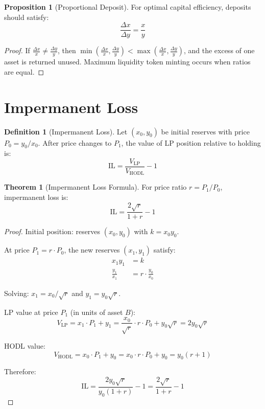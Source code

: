 \documentclass[11pt,a4paper]{article}
\theoremstyle{definition}
\newtheorem{definition}{Definition}
\newtheorem{theorem}{Theorem}
\newtheorem{proposition}{Proposition}
\begin{document}
\begin{proposition}[Proportional Deposit]
For optimal capital efficiency, deposits should satisfy:
\begin{equation}
\frac{\Delta x}{\Delta y} = \frac{x}{y}
\end{equation}
\end{proposition}

\begin{proof}
If $\frac{\Delta x}{x} \neq \frac{\Delta y}{y}$, then $\min\left(\frac{\Delta x}{x}, \frac{\Delta y}{y}\right) < \max\left(\frac{\Delta x}{x}, \frac{\Delta y}{y}\right)$, and the excess of one asset is returned unused. Maximum liquidity token minting occurs when ratios are equal.
\end{proof}

\section{Impermanent Loss}

\begin{definition}[Impermanent Loss]
Let $(x_0, y_0)$ be initial reserves with price $P_0 = y_0/x_0$. After price changes to $P_1$, the value of LP position relative to holding is:
\begin{equation}
\text{IL} = \frac{V_{\text{LP}}}{V_{\text{HODL}}} - 1
\end{equation}
\end{definition}

\begin{theorem}[Impermanent Loss Formula]
For price ratio $r = P_1/P_0$, impermanent loss is:
\begin{equation}
\text{IL} = \frac{2\sqrt{r}}{1 + r} - 1
\end{equation}
\end{theorem}

\begin{proof}
Initial position: reserves $(x_0, y_0)$ with $k = x_0 y_0$.

At price $P_1 = r \cdot P_0$, the new reserves $(x_1, y_1)$ satisfy:
\begin{align}
x_1 y_1 &= k \\
\frac{y_1}{x_1} &= r \cdot \frac{y_0}{x_0}
\end{align}

Solving: $x_1 = x_0/\sqrt{r}$ and $y_1 = y_0\sqrt{r}$.

LP value at price $P_1$ (in units of asset $B$):
\begin{equation}
V_{\text{LP}} = x_1 \cdot P_1 + y_1 = \frac{x_0}{\sqrt{r}} \cdot r \cdot P_0 + y_0\sqrt{r} = 2y_0\sqrt{r}
\end{equation}

HODL value:
\begin{equation}
V_{\text{HODL}} = x_0 \cdot P_1 + y_0 = x_0 \cdot r \cdot P_0 + y_0 = y_0(r + 1)
\end{equation}

Therefore:
\begin{equation}
\text{IL} = \frac{2y_0\sqrt{r}}{y_0(1 + r)} - 1 = \frac{2\sqrt{r}}{1 + r} - 1
\end{equation}
\end{proof}
\end{document}
